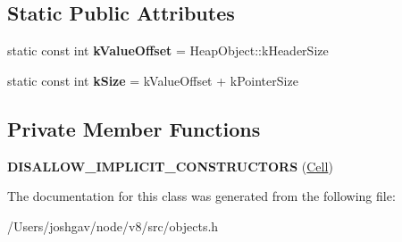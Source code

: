 \subsection*{Static Public Attributes}
\begin{DoxyCompactItemize}
\item 
static const int {\bfseries k\+Value\+Offset} = Heap\+Object\+::k\+Header\+Size\hypertarget{classv8_1_1internal_1_1_cell_acfd85eb2807c5733f141824831db579a}{}\label{classv8_1_1internal_1_1_cell_acfd85eb2807c5733f141824831db579a}

\item 
static const int {\bfseries k\+Size} = k\+Value\+Offset + k\+Pointer\+Size\hypertarget{classv8_1_1internal_1_1_cell_a89511edf4b516f88407a31344483d897}{}\label{classv8_1_1internal_1_1_cell_a89511edf4b516f88407a31344483d897}

\end{DoxyCompactItemize}
\subsection*{Private Member Functions}
\begin{DoxyCompactItemize}
\item 
{\bfseries D\+I\+S\+A\+L\+L\+O\+W\+\_\+\+I\+M\+P\+L\+I\+C\+I\+T\+\_\+\+C\+O\+N\+S\+T\+R\+U\+C\+T\+O\+RS} (\hyperlink{classv8_1_1internal_1_1_cell}{Cell})\hypertarget{classv8_1_1internal_1_1_cell_a710b20dad1cf2a398b34abe48d359795}{}\label{classv8_1_1internal_1_1_cell_a710b20dad1cf2a398b34abe48d359795}

\end{DoxyCompactItemize}


The documentation for this class was generated from the following file\+:\begin{DoxyCompactItemize}
\item 
/\+Users/joshgav/node/v8/src/objects.\+h\end{DoxyCompactItemize}
